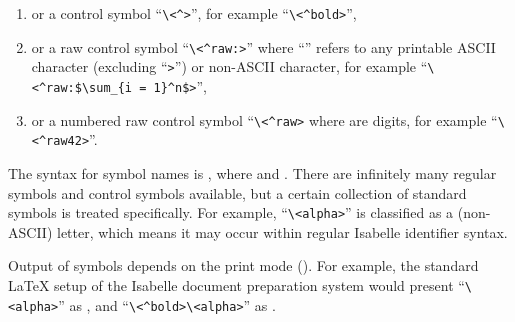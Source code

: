 \begin{isabellebody}
\begin{isamarkuptext}
\begin{enumerate}
\item or a control symbol ``\verb,\,\verb,<^,\verb,>,'', for example ``\verb,\,\verb,<^bold>,'',

\item or a raw control symbol ``\verb,\,\verb,<^raw:,\isa{{\isasymdots}}\verb,>,'' where ``\isa{{\isasymdots}}'' refers to any printable ASCII
character (excluding ``\verb,>,'') or non-ASCII character, for example
``\verb,\,\verb,<^raw:$\sum_{i = 1}^n$>,'',

\item or a numbered raw control symbol ``\verb,\,\verb,<^raw,\verb,>, where  are digits, for example
``\verb,\,\verb,<^raw42>,''.

\end{enumerate}

The  syntax for symbol names is , where  and .  There are infinitely many regular symbols and
control symbols available, but a certain collection of standard
symbols is treated specifically.  For example,
``\verb,\,\verb,<alpha>,'' is classified as a (non-ASCII) letter,
which means it may occur within regular Isabelle identifier syntax.

Output of symbols depends on the print mode ().
For example, the standard {\LaTeX} setup of the Isabelle document
preparation system would present ``\verb,\,\verb,<alpha>,'' as \isa{{\isasymalpha}}, and ``\verb,\,\verb,<^bold>,\verb,\,\verb,<alpha>,'' as \isa{\isactrlbold {\isasymalpha}}.


\end{isamarkuptext}
\end{isabellebody}
